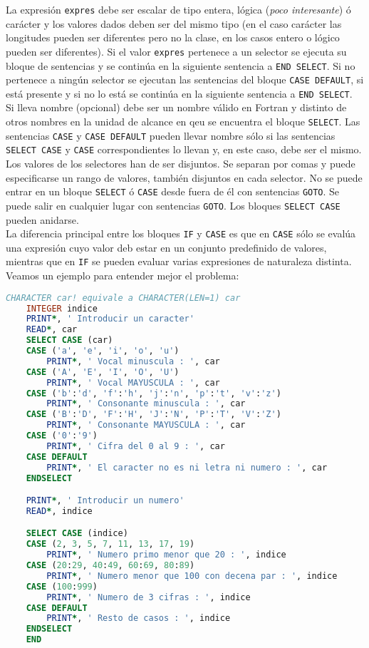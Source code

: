 La expresión {\tt expres} debe ser escalar de tipo entera, lógica ({\it poco interesante}) ó carácter y los valores dados deben ser del mismo tipo (en el caso carácter las longitudes pueden ser diferentes pero no la clase, en los casos entero o lógico pueden ser diferentes). Si el valor {\tt expres} pertenece a un selector se ejecuta su bloque de sentencias y se continúa en la siguiente sentencia a  {\tt END SELECT}. Si no pertenece a ningún selector se ejecutan las sentencias del bloque \texttt{CASE DEFAULT}, si está presente y si no lo está se continúa en la siguiente sentencia a {\tt END SELECT}. \\

Si lleva nombre (opcional) debe ser un nombre válido en Fortran y distinto de otros nombres en la unidad de alcance en qeu se encuentra el bloque {\tt SELECT}. Las sentencias \texttt{CASE} y \texttt{CASE DEFAULT} pueden llevar nombre sólo si las sentencias {\tt SELECT CASE} y {\tt CASE} correspondientes lo llevan y, en este caso, debe ser el mismo. Los valores de los selectores han de ser disjuntos. Se separan por comas y puede especificarse un rango de valores, también disjuntos en cada selector. No se puede entrar en un bloque {\tt SELECT} ó {\tt CASE} desde fuera de él con sentencias {\tt GOTO}. Se puede salir en cualquier lugar con sentencias {\tt GOTO}. Los bloques {\tt SELECT CASE} pueden anidarse. \\

La diferencia principal entre los bloques {\tt IF} y {\tt CASE} es que en {\tt CASE} sólo se evalúa una expresión cuyo valor deb estar en un conjunto predefinido de valores, mientras que en {\tt IF} se pueden evaluar varias expresiones de naturaleza distinta. Veamos un ejemplo para entender mejor el problema:

\begin{lstlisting}[language=Fortran]
	CHARACTER car! equivale a CHARACTER(LEN=1) car
	INTEGER indice
	PRINT*, ' Introducir un caracter'
	READ*, car
	SELECT CASE (car)
	CASE ('a', 'e', 'i', 'o', 'u')
		PRINT*, ' Vocal minuscula : ', car
	CASE ('A', 'E', 'I', 'O', 'U')
		PRINT*, ' Vocal MAYUSCULA : ', car
	CASE ('b':'d', 'f':'h', 'j':'n', 'p':'t', 'v':'z')
		PRINT*, ' Consonante minuscula : ', car
	CASE ('B':'D', 'F':'H', 'J':'N', 'P':'T', 'V':'Z')
		PRINT*, ' Consonante MAYUSCULA : ', car
	CASE ('0':'9')
		PRINT*, ' Cifra del 0 al 9 : ', car
	CASE DEFAULT
		PRINT*, ' El caracter no es ni letra ni numero : ', car
	ENDSELECT

	PRINT*, ' Introducir un numero'
	READ*, indice

	SELECT CASE (indice)
	CASE (2, 3, 5, 7, 11, 13, 17, 19)
		PRINT*, ' Numero primo menor que 20 : ', indice
	CASE (20:29, 40:49, 60:69, 80:89)
		PRINT*, ' Numero menor que 100 con decena par : ', indice
	CASE (100:999)
		PRINT*, ' Numero de 3 cifras : ', indice
	CASE DEFAULT
		PRINT*, ' Resto de casos : ', indice
	ENDSELECT
	END
	
\end{lstlisting}

